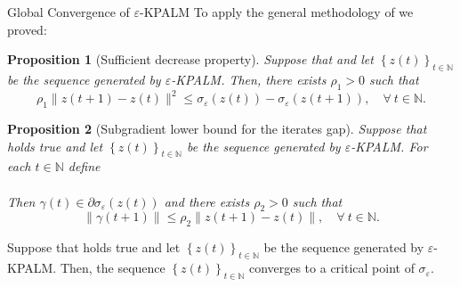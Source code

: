 \documentclass[9pt,handout]{beamer} %
\newtheorem{proposition}{Proposition}
\newcommand{\nn}{\mathbb{N}} %
\begin{document}
	\begin{frame}{Global Convergence of $\varepsilon$-KPALM}
		To apply the general methodology of {\dblue [BST]} we proved:
		\pause
		\begin{proposition}[Sufficient decrease property]
		Suppose that  and let $\left\lbrace z(t) \right\rbrace_{t \in \mathbb{N}}$ be the sequence generated by $\varepsilon$-KPALM. Then, there exists $\rho_1 > 0$ such that 
		\begin{equation*}
			\rho_1 \|z(t+1) - z(t)\|^2 \leq \sigma_{\varepsilon}(z(t)) - \sigma_{\varepsilon}(z(t+1)), \quad \forall \: t \in \mathbb{N} .
		\end{equation*}
		\end{proposition}
		\pause
		\begin{proposition}[Subgradient lower bound for the iterates gap]
		Suppose that  holds true and let $\left\lbrace z(t) \right\rbrace_{t \in \mathbb{N}}$ be the sequence generated by $\varepsilon$-KPALM. 
		For each $t \in \nn$ define\\
		\\
		Then $\gamma(t) \in \partial \sigma_{\varepsilon}(z(t))$ and there exists $\rho_2 > 0$ such that 
		\begin{equation*}
			\| \gamma(t+1)\| \leq \rho_2 \|z(t+1) - z(t)\|, \quad \forall \: t \in \mathbb{N} .
		\end{equation*}
		\end{proposition}
		\pause
		\begin{theorem}
		Suppose that  holds true and let $\left\lbrace z(t) \right\rbrace_{t \in \mathbb{N}}$ be the sequence generated by $\varepsilon$-KPALM. Then, the sequence $\left\lbrace z(t) \right\rbrace_{t \in \nn}$ converges to a critical point of $\sigma_{\varepsilon}$.
		\end{theorem}
	\end{frame}	
	
\end{document}
